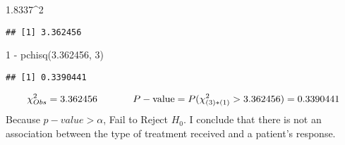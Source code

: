 \documentclass[
]{article}
\newenvironment{Shaded}{\begin{snugshade}}{\end{snugshade}}
\newcommand{\DecValTok}[1]{\textcolor[rgb]{0.00,0.00,0.81}{#1}}
\newcommand{\FloatTok}[1]{\textcolor[rgb]{0.00,0.00,0.81}{#1}}
\newcommand{\FunctionTok}[1]{\textcolor[rgb]{0.00,0.00,0.00}{#1}}
\newcommand{\NormalTok}[1]{#1}
\newcommand{\SpecialCharTok}[1]{\textcolor[rgb]{0.00,0.00,0.00}{#1}}
\begin{document}
\begin{Shaded}
\begin{Highlighting}[]
\FloatTok{1.8337}\SpecialCharTok{\^{}}\DecValTok{2}
\end{Highlighting}
\end{Shaded}

\begin{verbatim}
## [1] 3.362456
\end{verbatim}

\begin{Shaded}
\begin{Highlighting}[]
\DecValTok{1} \SpecialCharTok{{-}} \FunctionTok{pchisq}\NormalTok{(}\FloatTok{3.362456}\NormalTok{, }\DecValTok{3}\NormalTok{)}
\end{Highlighting}
\end{Shaded}

\begin{verbatim}
## [1] 0.3390441
\end{verbatim}

\[
\chi^{2}_{Obs} = 3.362456 \hspace{0.5in} P-\text{value} = P(\chi^{2}_{(3)*(1)} > 3.362456) = 0.3390441
\] Because \(p-value > \alpha\), Fail to Reject \(H_{0}\). I conclude
that there is not an association between the type of treatment received
and a patient's response.
\end{document}
